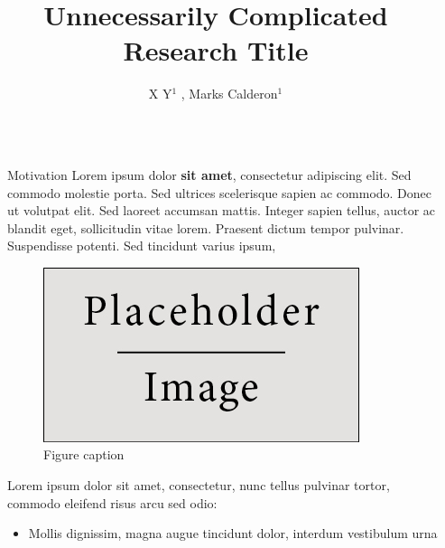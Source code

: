 \documentclass[final]{beamer}
\title{Unnecessarily Complicated Research Title} %
\author{X Y$^{1}$ , Marks Calderon$^{1}$} %
\institute{$^{1}$ESAN University} %
\newlength{\sepwid}
\newlength{\onecolwid}
\begin{document}

\setlength{\belowcaptionskip}{2ex} %
\setlength\belowdisplayshortskip{2ex} %

\begin{frame}[t] %

\begin{columns}[t] %

\begin{column}{\sepwid}\end{column} %

\begin{column}{\onecolwid} %



\begin{block}{Motivation}
	Lorem ipsum dolor \textbf{sit amet}, consectetur adipiscing elit. Sed commodo molestie porta. Sed ultrices scelerisque sapien ac commodo. Donec ut volutpat elit. Sed laoreet accumsan mattis. Integer sapien tellus, auctor ac blandit eget, sollicitudin vitae lorem. Praesent dictum tempor pulvinar. Suspendisse potenti. Sed tincidunt varius ipsum,
	\begin{figure}
		\includegraphics[width=0.8\linewidth]{placeholder.jpg}
		\caption{Figure caption}
	\end{figure}

Lorem ipsum dolor sit amet, consectetur, nunc tellus pulvinar tortor, commodo eleifend risus arcu sed odio:
\begin{itemize}
	\item Mollis dignissim, magna augue tincidunt dolor, interdum vestibulum urna
\end{itemize}


\end{block}
\end{column}
\end{columns}
\end{frame}
\end{document}
